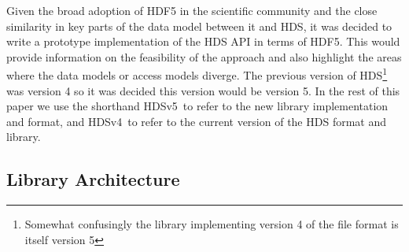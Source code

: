 \documentclass[final,authoryear,5p,times,twocolumn]{elsarticle}
\newcommand{\new}{HDSv5}
\newcommand{\old}{HDSv4}
\begin{document}
Given the broad adoption of HDF5 in the scientific community and the
close similarity in key parts of the data model between it and HDS, it
was decided to write a prototype implementation of the HDS API in
terms of HDF5. This would provide information on the feasibility of
the approach and also highlight the areas where the data models or
access models diverge. The previous version of HDS\footnote{Somewhat
  confusingly the library implementing version 4 of the file format is
  itself version 5} was version 4 so it
was decided this version would be version 5.
In the rest of this paper we use the shorthand
\new\ to refer to the new library implementation and format, and \old\
to refer to the current version of the HDS format and library.

\subsection{Library Architecture}
\end{document}
